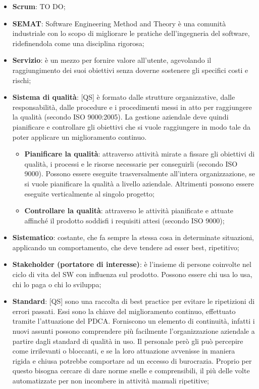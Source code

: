 \begin{itemize}
	\item \textbf{Scrum}: TO DO;
	\item \textbf{SEMAT}: Software Engineering Method and Theory è una comunità industriale con lo scopo di migliorare le pratiche dell'ingegneria del software, ridefinendola come una disciplina rigorosa;
	\item \textbf{Servizio}: è un mezzo per fornire valore all'utente, agevolando il raggiungimento dei suoi obiettivi senza doverne sostenere gli specifici costi e rischi;
	\item \textbf{Sistema di qualità}: [QS] è formato dalle strutture organizzative, dalle responsabilità, dalle procedure e i procedimenti messi in atto per raggiungere la qualità (secondo ISO 9000:2005). La gestione aziendale deve quindi pianificare e controllare gli obiettivi che si vuole raggiungere in modo tale da poter applicare un miglioramento continuo.
		\begin{itemize}
			\item \textbf{Pianificare la qualità}: attraverso attività mirate a fissare gli obiettivi di qualità, i processi e le risorse necessarie per conseguirli (secondo ISO 9000). Possono essere eseguite trasversalmente all'intera organizzazione, se si vuole pianificare la qualità a livello aziendale. Altrimenti possono essere eseguite verticalmente al singolo progetto;
			\item \textbf{Controllare la qualità}: attraverso le attività pianificate e attuate affinché il prodotto soddisfi i requisiti attesi (secondo ISO 9000);
		\end{itemize}


	\item \textbf{Sistematico}: costante, che fa sempre la stessa cosa in determinate situazioni, applicando un comportamento, che deve tendere ad esser best, ripetitivo;
	\item \textbf{Stakeholder (portatore di interesse)}: è l'insieme di persone coinvolte nel ciclo di vita del SW con influenza sul prodotto. \newline
	Possono essere chi usa lo usa, chi lo paga o chi lo sviluppa;
	\item \textbf{Standard}: [QS] sono una raccolta di best practice per evitare le ripetizioni di errori passati. Essi sono la chiave del miglioramento continuo, effettuato tramite l'attuazione del PDCA. \newline
	Forniscono un elemento di continuità, infatti i nuovi assunti possono comprendere più facilmente l'organizzazione aziendale a partire dagli standard di qualità in uso. \newline
	Il personale però gli può percepire come irrilevanti o bloccanti, e se la loro attuazione avvenisse in maniera rigida e chiusa potrebbe comportare ad un eccesso di burocrazia. Proprio per questo bisogna cercare di dare norme snelle e comprensibili, il più delle volte automatizzate per non incombere in attività manuali ripetitive;

\end{itemize}